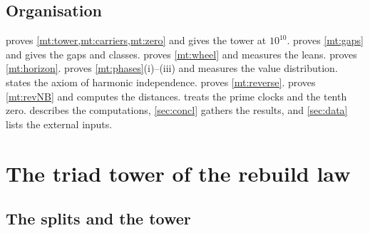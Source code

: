 \documentclass[11pt]{article}
\theoremstyle{definition}\newtheorem{definition}[theorem]{Definition}
\theoremstyle{remark}\newtheorem{remark}[theorem]{Remark}
\theoremstyle{definition}\newtheorem{axiom}{Axiom}
\begin{document}
\subsection{Organisation}

 proves \cref{mt:tower,mt:carriers,mt:zero} and gives the tower at $10^{10}$.  proves \cref{mt:gaps} and gives the gaps and classes.  proves \cref{mt:wheel} and measures the leans.  proves \cref{mt:horizon}.  proves \cref{mt:phases}(i)--(iii) and measures the value distribution.  states the axiom of harmonic independence.  proves \cref{mt:reverse}.  proves \cref{mt:revNB} and computes the distances.  treats the prime clocks and the tenth zero.  describes the computations, \cref{sec:concl} gathers the results, and \cref{sec:data} lists the external inputs.

\section{The triad tower of the rebuild law}\label{sec:tower}

\subsection{The splits and the tower}
\end{document}
